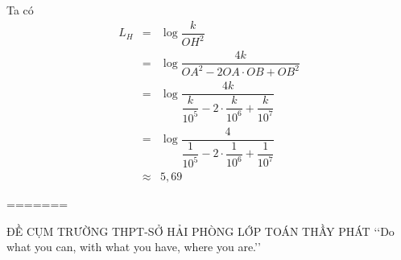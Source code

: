 \begin{ex}
{\begin{itemize}
\begin{center}
			\end{center}
			Ta có
			\allowdisplaybreaks
			\begin{eqnarray*}
				L_{H}&=&\log \dfrac{k}{OH^{2}}\\
				&=&\log \dfrac{4k}{OA^{2}-2OA\cdot OB+OB^{2}}\\
				&=&\log \dfrac{4k}{\dfrac{k}{10^{5}}-2\cdot \dfrac{k}{10^{6}}+\dfrac{k}{10^{7}}}\\
				&=&\log \dfrac{4}{\dfrac{1}{10^{5}}-2\cdot \dfrac{1}{10^{6}}+\dfrac{1}{10^{7}}}\\
				&\approx& 5{,}69
			\end{eqnarray*}
		\end{itemize}	
	}
\end{ex}
=======
\begin{name}
	{\tenchude}
	{ĐỀ CỤM TRƯỜNG THPT-SỞ HẢI PHÒNG}
	{LỚP TOÁN THẦY PHÁT}
	{\lq\lq  Do what you can, with what you have, where you are.\rq\rq}
\end{name}

